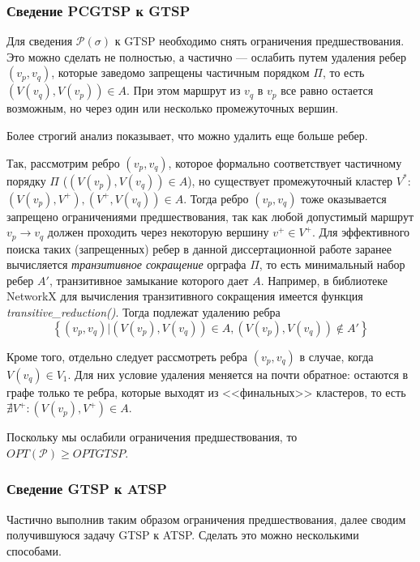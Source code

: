 \subsubsection{Сведение PCGTSP к GTSP}

Для сведения
$\mathcal P(\sigma)$
к GTSP
необходимо снять ограничения предшествования.
Это можно сделать не полностью, а частично ---
ослабить
путем удаления ребер
$(v_p, v_q)$, которые заведомо запрещены
частичным порядком $\Pi$,
то есть
$(V(v_q), V(v_p))\in A$.
При этом маршрут из $v_q$ в $v_p$
все равно остается возможным,
но через один или несколько промежуточных вершин.

Более строгий анализ показывает,
что можно удалить еще больше ребер.

Так, рассмотрим ребро
$(v_p, v_q)$,
которое формально соответствует частичному порядку $\Pi$
($(V(v_p), V(v_q))\in A$),
но существует промежуточный кластер $V^*$:
$(V(v_p), V^+), (V^+, V(v_q))\in A$.
Тогда ребро
$(v_p, v_q)$
тоже оказывается запрещено ограничениями предшествования,
так как любой допустимый маршрут
$v_p \to v_q$
должен проходить через некоторую вершину
$v^+ \in V^+$.
Для эффективного поиска таких
(запрещенных)
ребер
в данной диссертационной работе
заранее вычисляется
\textit{транзитивное сокращение}
орграфа $\Pi$,
то есть минимальный набор ребер
$A'$,
транзитивное замыкание которого дает $A$.
Например, в библиотеке NetworkX \cite{bi:NetworkX}
для вычисления транзитивного сокращения
имеется функция \textit{transitive\_reduction()}.
Тогда подлежат удалению ребра
$$
\left\{(v_p, v_q)|
  (V(v_p), V(v_q))\in A, (V(v_p), V(v_q))\notin A'\right\}
$$

Кроме того, отдельно следует рассмотреть ребра
$(v_p, v_q)$
в случае, когда
$V(v_q)\in V_1$.
Для них условие удаления меняется на почти обратное:
остаются в графе только те ребра,
которые выходят из <<финальных>> кластеров,
то есть
$\nexists V^+ \colon (V(v_p), V^+)\in A$.

Поскольку мы ослабили ограничения предшествования,
то
$OPT(\mathcal P) \geqslant OPT{GTSP}$.

\subsubsection{Сведение GTSP к ATSP}
Частично выполнив таким образом ограничения предшествования,
далее сводим получившуюся задачу GTSP
к ATSP. Сделать это можно несколькими способами.

